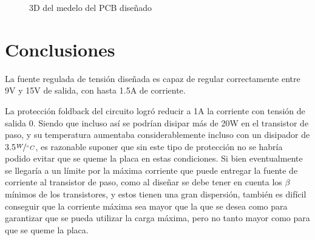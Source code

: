 \documentclass{article}
\begin{document}
\newgeometry{} %


\tableofcontents
\newpage





\begin{figure}[htp]
	\centering
	\caption{3D del medelo del PCB dise\~nado}
	\label{fig:placa}
\end{figure}







\section{Conclusiones}

La fuente regulada de tensi\'on dise\~nada es capaz de regular correctamente entre 9V y 15V de salida, con hasta 1.5A de corriente.

La protecci\'on foldback del circuito logr\'o reducir a 1A la corriente con tensi\'on de salida 0. Siendo que incluso as\'i se podr\'ian disipar m\'as de 20W en el transistor de paso, y su temperatura aumentaba considerablemente incluso con un disipador de 3.5$\nicefrac{W}{^\circ C}$,  es razonable suponer que sin este tipo de protecci\'on no se habr\'ia podido evitar que se queme la placa en estas condiciones. Si bien eventualmente se llegar\'ia a un l\'imite por la m\'axima corriente que puede entregar la fuente de corriente al transistor de paso, como al dise\~nar se debe tener en cuenta los $\beta$ m\'inimos de los transistores, y estos tienen una gran dispersi\'on, tambi\'en es dif\'icil conseguir que la corriente m\'axima sea mayor que la que se desea como para garantizar que se pueda utilizar la carga m\'axima, pero no tanto mayor como para que se queme la placa. 
 




\clearpage
\end{document}

